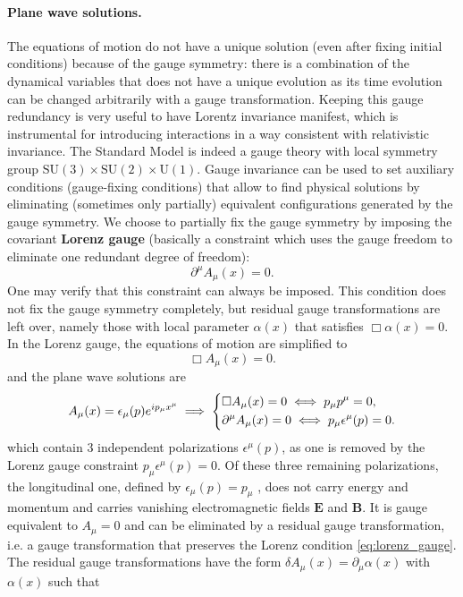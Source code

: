 \paragraph{Plane wave solutions.}
The equations of motion do not have a unique solution (even after fixing initial conditions) because of the gauge symmetry: there is a combination of the dynamical variables that does not have a unique evolution as its time evolution can be changed arbitrarily with a gauge transformation. Keeping this gauge redundancy is very useful to have Lorentz invariance manifest, which is instrumental for introducing interactions in a way consistent with relativistic invariance. The Standard Model is indeed a gauge theory with local symmetry group \(\mathrm{SU}(3) \times \mathrm{SU}(2) \times \mathrm{U}(1)\). Gauge invariance can be used to set auxiliary conditions (gauge-fixing conditions) that allow to find physical solutions by eliminating (sometimes only partially) equivalent configurations generated by the gauge symmetry. We choose to partially fix the gauge symmetry by imposing the covariant \textbf{Lorenz gauge} (basically a constraint which uses the gauge freedom to eliminate one redundant degree of freedom):
\begin{equation}
    \partial^{\mu} A_\mu(x) = 0.
    \label{eq:lorenz_gauge}
\end{equation}
One may verify that this constraint can always be imposed. This condition does not fix the gauge symmetry completely, but residual gauge transformations are left over, namely those with local parameter \(\alpha(x)\) that satisfies \(\Box \alpha(x)=0\). In the Lorenz gauge, the equations of motion are simplified to
\[
    \Box A_\mu(x) = 0.
\]
and the plane wave solutions are
\[
    A_{\mu}(x) = \epsilon_{\mu}(p) e^{i p_\mu x^{\mu}} \implies \begin{dcases}
        \Box A_\mu(x) = 0 \iff p_\mu p^{\mu} = 0, \\
        \partial^{\mu} A_\mu(x) = 0 \iff p_\mu \epsilon^{\mu}(p) = 0.
    \end{dcases}
\]
which contain 3 independent polarizations \(\epsilon^{\mu}(p)\), as one is removed by the Lorenz gauge constraint \(p_{\mu}\epsilon^{\mu}(p) = 0\). Of these three remaining polarizations, the longitudinal one, defined by \(\epsilon_\mu(p) = p_\mu\) , does not carry energy and momentum and carries vanishing electromagnetic fields \(\mathbf{E}\) and \(\mathbf{B}\). It is gauge equivalent to \(A_{\mu}=0\) and can be eliminated by a residual gauge transformation, i.e. a gauge transformation that preserves the Lorenz condition \eqref{eq:lorenz_gauge}. The residual gauge transformations have the form \(\delta A_\mu(x) = \partial_\mu \alpha(x)\) with \(\alpha(x)\) such that

